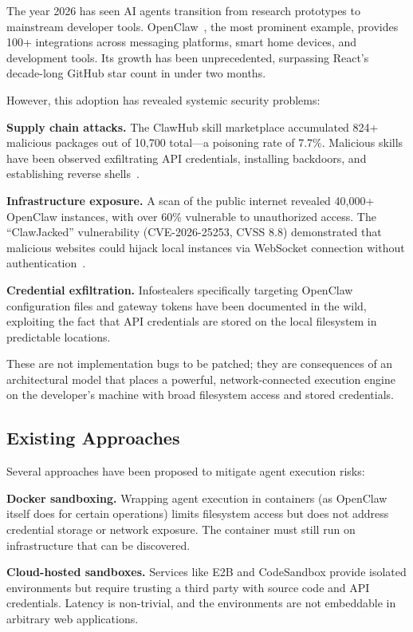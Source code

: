 \documentclass[11pt,twocolumn]{article}
\begin{document}
The year 2026 has seen AI agents transition from research prototypes to mainstream developer tools. OpenClaw~\cite{openclaw2026}, the most prominent example, provides 100+ integrations across messaging platforms, smart home devices, and development tools. Its growth has been unprecedented, surpassing React's decade-long GitHub star count in under two months.

However, this adoption has revealed systemic security problems:

\textbf{Supply chain attacks.} The ClawHub skill marketplace accumulated 824+ malicious packages out of 10,700 total---a poisoning rate of 7.7\%. Malicious skills have been observed exfiltrating API credentials, installing backdoors, and establishing reverse shells~\cite{thehackernews2026}.

\textbf{Infrastructure exposure.} A scan of the public internet revealed 40,000+ OpenClaw instances, with over 60\% vulnerable to unauthorized access. The ``ClawJacked'' vulnerability (CVE-2026-25253, CVSS 8.8) demonstrated that malicious websites could hijack local instances via WebSocket connection without authentication~\cite{clawjacked2026}.

\textbf{Credential exfiltration.} Infostealers specifically targeting OpenClaw configuration files and gateway tokens have been documented in the wild, exploiting the fact that API credentials are stored on the local filesystem in predictable locations.

These are not implementation bugs to be patched; they are consequences of an architectural model that places a powerful, network-connected execution engine on the developer's machine with broad filesystem access and stored credentials.

\subsection{Existing Approaches}

Several approaches have been proposed to mitigate agent execution risks:

\textbf{Docker sandboxing.} Wrapping agent execution in containers (as OpenClaw itself does for certain operations) limits filesystem access but does not address credential storage or network exposure. The container must still run on infrastructure that can be discovered.

\textbf{Cloud-hosted sandboxes.} Services like E2B and CodeSandbox provide isolated environments but require trusting a third party with source code and API credentials. Latency is non-trivial, and the environments are not embeddable in arbitrary web applications.
\end{document}
